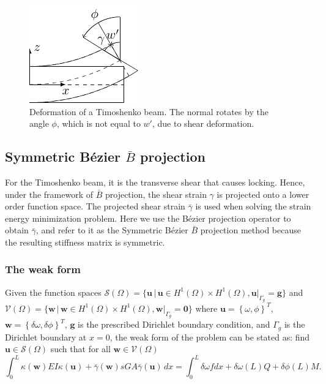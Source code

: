 \documentclass{article}
\newcommand{\Bezier}{{B\'{e}zier} }
\begin{document}
\begin{figure}[ht]
  \centering
  \includegraphics[width=0.25\linewidth]{timoshenko_beam_shape}
  \caption{Deformation of a Timoshenko beam. The normal rotates by the angle $\phi$, which is not equal to $w'$, due to shear deformation.}
  \label{fig:Timoshenko_beam_cross}
\end{figure}

\subsection{Symmetric \Bezier $\bar{B}$ projection}
\label{sec:symmetric-projection}
{\color{blue}For the Timoshenko beam, it is the transverse shear that causes locking. Hence, under the framework of $\bar{B}$ projection, the shear strain $\gamma$ is projected onto a lower order function space. The projected shear strain $\bar{\gamma}$ is used when solving the strain energy minimization problem. Here we use the \Bezier projection operator to obtain $\bar{\gamma}$, and refer to it as the Symmetric \Bezier $\bar{B}$ projection method because the resulting stiffness matrix is symmetric.}

\subsubsection{The weak form}

\sloppy Given the function spaces $\mathcal{S}(\Omega)=\{{\mathbf{u} \, \vert \, {\mathbf{u}\in{H^1(\Omega)\times{H^1(\Omega)}}},\mathbf{u}\vert_{\Gamma_{g}}=\mathbf{g}}\}$ and $\mathcal{V}(\Omega)=\{{\mathbf{w} \, \vert \, {\mathbf{w}\in{H^1(\Omega)\times{H^1(\Omega)}}}, \allowbreak \mathbf{w}\vert_{\Gamma_{g}}=\mathbf{0}}\}$ where $\mathbf{u}=\left\{{\omega,\phi}\right\}^T$, $\mathbf{w}=\left\{{\delta\omega,\delta\phi}\right\}^T$, $\mathbf{g}$ is the prescribed Dirichlet boundary condition, and $\Gamma_g$ is the Dirichlet boundary at $x=0$, the weak form of the problem can be stated as: find $\mathbf{u}\in{\mathcal{S}(\Omega)}$ such that for all $\mathbf{w}\in{\mathcal{V}(\Omega)}$
\begin{equation}
    {\int_{0}^L\kappa(\mathbf{w})EI\kappa(\mathbf{u}) + \bar{\gamma}(\mathbf{w})sGA\bar{\gamma}(\mathbf{u})} \, dx=\int_0^L\delta\omega f dx+\delta\omega(L)Q+\delta\phi(L)M.
\end{equation}
\end{document}
